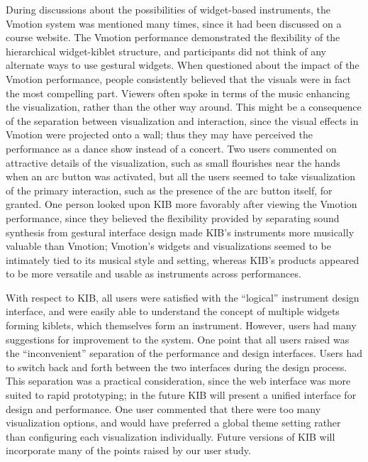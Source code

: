 \documentclass{nime-alternate}
\begin{document}
During discussions about the possibilities of widget-based instruments, the Vmotion system was mentioned many
times, since it had been discussed on a course website. The Vmotion performance demonstrated the flexibility
of the hierarchical widget-kiblet structure, and participants did not think of any alternate ways to use gestural widgets.
When questioned about the impact of the Vmotion performance, people consistently believed that the visuals were in 
fact the most compelling part. Viewers often spoke in terms of the music enhancing the visualization, rather than the
other way around. This might
be a consequence of the separation between visualization and interaction, since the visual effects in Vmotion were
projected onto a wall; thus they may have perceived the performance as a dance show instead of a concert.
Two users commented on attractive details of the visualization, such as small flourishes near
the hands when an arc button was activated, but all the users seemed to take visualization of the primary interaction, such
as the presence of the arc button itself, for granted. One person looked upon KIB more favorably after viewing the
Vmotion performance, since they believed the flexibility provided by separating sound synthesis from gestural interface design
made KIB's instruments more musically valuable than Vmotion; Vmotion's widgets and visualizations seemed to be
intimately tied to its musical style and setting, whereas KIB's products appeared to be more versatile and usable
as instruments across performances.

With respect to KIB, all users were satisfied with the ``logical'' instrument design interface, 
and were easily able to understand the concept of multiple widgets forming kiblets, which 
themselves form an instrument. However, users had many suggestions for improvement to the system.
One point that all users raised was the ``inconvenient'' separation of the performance and design interfaces. Users
had to switch back and forth between the two interfaces during the design process.
This separation was a practical consideration, since the web interface was more suited to rapid prototyping; in
the future KIB will present a unified interface for design and performance. One user commented that there were too
many visualization options, and would have preferred a global theme setting rather than configuring each visualization
individually. Future versions of KIB will incorporate many of the points raised by our user study.
\end{document}
